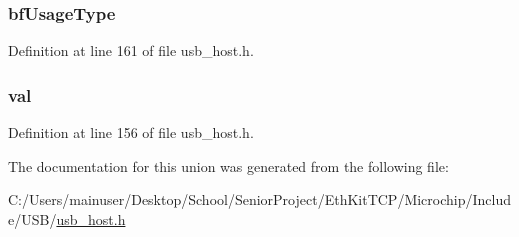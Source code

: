 \subsubsection[{bf\+Usage\+Type}]{ bf\+Usage\+Type}\label{union_t_r_a_n_s_f_e_r___a_t_t_r_i_b_u_t_e_s_abe325c915ac512359b40cf17eb3f5dfb}


Definition at line 161 of file usb\+\_\+host.\+h.

\hypertarget{union_t_r_a_n_s_f_e_r___a_t_t_r_i_b_u_t_e_s_a5986ea8162aa0f6608b36b20964044dd}{}
\subsubsection[{val}]{ val}\label{union_t_r_a_n_s_f_e_r___a_t_t_r_i_b_u_t_e_s_a5986ea8162aa0f6608b36b20964044dd}


Definition at line 156 of file usb\+\_\+host.\+h.



The documentation for this union was generated from the following file\+:\begin{DoxyCompactItemize}
\item 
C\+:/\+Users/mainuser/\+Desktop/\+School/\+Senior\+Project/\+Eth\+Kit\+T\+C\+P/\+Microchip/\+Include/\+U\+S\+B/\hyperlink{usb__host_8h}{usb\+\_\+host.\+h}\end{DoxyCompactItemize}
